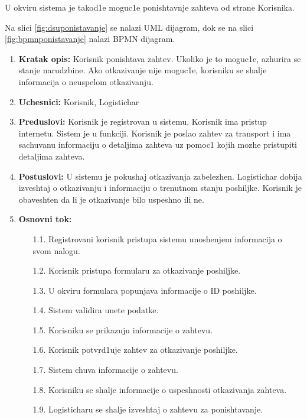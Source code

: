 
U okviru sistema je takod1e moguc1e ponishtavnje zahteva od strane Korisnika.

Na slici \ref{fig:dsuponistavanje} se nalazi UML dijagram, dok se na slici \ref{fig:bpmnponistavanje} nalazi BPMN dijagram.


\begin{enumerate}
    \item \textbf{Kratak opis:} Korisnik ponishtava zahtev. Ukoliko je to moguc1e, azhurira se stanje narudzbine. Ako otkazivanje nije moguc1e, korisniku se shalje informacija o neuspelom otkazivanju.
    
    \item \textbf{Uchesnici:} Korisnik, Logistichar
    \item \textbf{Preduslovi:} Korisnik je registrovan u sistemu. Korisnik ima pristup internetu. Sistem je u funkciji. Korisnik je poslao zahtev za transport i ima sachuvanu informaciju o detaljima zahteva uz pomoc1 kojih mozhe pristupiti detaljima zahteva.
    
    \item \textbf{Postuslovi:} U sistemu je pokushaj otkazivanja zabelezhen. Logistichar dobija izveshtaj o otkazivanju i informaciju o trenutnom stanju poshiljke. Korisnik je obaveshten da li je otkazivanje bilo uspeshno ili ne. 
    \item \textbf{Osnovni tok:}
        \begin{enumerate}
            \item[1.1.] Registrovani korisnik pristupa sistemu unoshenjem informacija o svom nalogu.
            
            \item[1.2.] Korisnik pristupa formularu za otkazivanje poshiljke.
            \item[1.3.] U okviru formulara popunjava informacije o ID poshiljke.
            \item[1.4.] Sistem validira unete podatke.
            \item[1.5.] Korisniku se prikazuju informacije o zahtevu.
            \item[1.6.] Korisnik potvrd1uje zahtev za otkazivanje poshiljke. 
            \item[1.7.] Sistem chuva informacije o zahtevu.
            \item[1.8.] Korisniku se shalje informacije o uspeshnosti otkazivanja zahteva.
            \item[1.9.] Logisticharu se shalje izveshtaj o zahtevu za ponishtavanje.
            

\end{enumerate}
\end{enumerate}
